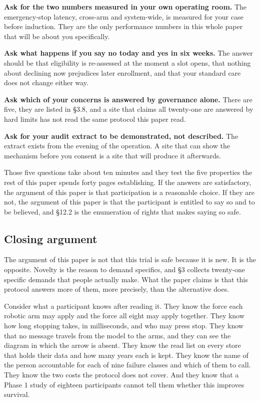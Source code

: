 \textbf{Ask for the two numbers measured in your own operating room.} The
emergency-stop latency, cross-arm and system-wide, is measured for your case
before induction. They are the only performance numbers in this whole paper
that will be about you specifically.

\textbf{Ask what happens if you say no today and yes in six weeks.} The answer
should be that eligibility is re-assessed at the moment a slot opens, that
nothing about declining now prejudices later enrollment, and that your standard
care does not change either way.

\textbf{Ask which of your concerns is answered by governance alone.} There are
five, they are listed in \S 3.8, and a site that claims all twenty-one are
answered by hard limits has not read the same protocol this paper read.

\textbf{Ask for your audit extract to be demonstrated, not described.} The
extract exists from the evening of the operation. A site that can show the
mechanism before you consent is a site that will produce it afterwards.

Those five questions take about ten minutes and they test the five properties
the rest of this paper spends forty pages establishing. If the answers are
satisfactory, the argument of this paper is that participation is a reasonable
choice. If they are not, the argument of this paper is that the participant is
entitled to say so and to be believed, and \S 12.2 is the enumeration of rights
that makes saying so safe.

\subsection{Closing argument}

The argument of this paper is not that this trial is safe because it is new. It
is the opposite. Novelty is the reason to demand specifics, and \S 3 collects
twenty-one specific demands that people actually make. What the paper claims is
that this protocol answers more of them, more precisely, than the alternative
does.

Consider what a participant knows after reading it. They know the force each
robotic arm may apply and the force all eight may apply together. They know how
long stopping takes, in milliseconds, and who may press stop. They know that no
message travels from the model to the arms, and they can see the diagram in
which the arrow is absent. They know the read list on every store that holds
their data and how many years each is kept. They know the name of the person
accountable for each of nine failure classes and which of them to call. They
know the two costs the protocol does not cover. And they know that a Phase 1
study of eighteen participants cannot tell them whether this improves survival.


